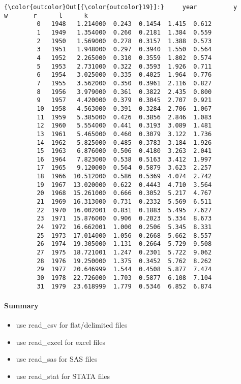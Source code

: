 \documentclass[11pt]{article}
\providecommand{\tightlist}{%
      \setlength{\itemsep}{0pt}\setlength{\parskip}{0pt}}
\begin{document}
\begin{Verbatim}[commandchars=\\\{\}]
{\color{outcolor}Out[{\color{outcolor}19}]:}     year          y      w       r      l      k
         0   1948   1.214000  0.243  0.1454  1.415  0.612
         1   1949   1.354000  0.260  0.2181  1.384  0.559
         2   1950   1.569000  0.278  0.3157  1.388  0.573
         3   1951   1.948000  0.297  0.3940  1.550  0.564
         4   1952   2.265000  0.310  0.3559  1.802  0.574
         5   1953   2.731000  0.322  0.3593  1.926  0.711
         6   1954   3.025000  0.335  0.4025  1.964  0.776
         7   1955   3.562000  0.350  0.3961  2.116  0.827
         8   1956   3.979000  0.361  0.3822  2.435  0.800
         9   1957   4.420000  0.379  0.3045  2.707  0.921
         10  1958   4.563000  0.391  0.3284  2.706  1.067
         11  1959   5.385000  0.426  0.3856  2.846  1.083
         12  1960   5.554000  0.441  0.3193  3.089  1.481
         13  1961   5.465000  0.460  0.3079  3.122  1.736
         14  1962   5.825000  0.485  0.3783  3.184  1.926
         15  1963   6.876000  0.506  0.4180  3.263  2.041
         16  1964   7.823000  0.538  0.5163  3.412  1.997
         17  1965   9.120000  0.564  0.5879  3.623  2.257
         18  1966  10.512000  0.586  0.5369  4.074  2.742
         19  1967  13.020000  0.622  0.4443  4.710  3.564
         20  1968  15.261000  0.666  0.3052  5.217  4.767
         21  1969  16.313000  0.731  0.2332  5.569  6.511
         22  1970  16.002001  0.831  0.1883  5.495  7.627
         23  1971  15.876000  0.906  0.2023  5.334  8.673
         24  1972  16.662001  1.000  0.2506  5.345  8.331
         25  1973  17.014000  1.056  0.2668  5.662  8.557
         26  1974  19.305000  1.131  0.2664  5.729  9.508
         27  1975  18.721001  1.247  0.2301  5.722  9.062
         28  1976  19.250000  1.375  0.3452  5.762  8.262
         29  1977  20.646999  1.544  0.4508  5.877  7.474
         30  1978  22.726000  1.703  0.5877  6.108  7.104
         31  1979  23.618999  1.779  0.5346  6.852  6.874
\end{Verbatim}
            
    \paragraph{Summary}\label{summary}

\begin{itemize}
\tightlist
\item
  use read\_csv for flat/delimited files
\item
  use read\_excel for excel files
\item
  use read\_sas for SAS files
\item
  use read\_stat for STATA files
\end{itemize}


    
    
    
    
\end{document}
